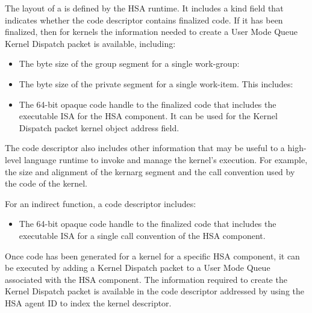 \documentclass[final,oneside]{book}
\begin{document}
The layout of a  is defined by the HSA runtime.
It includes a kind field  that indicates whether
the code descriptor contains finalized code. If it has been finalized, then for
kernels the information needed to create a User Mode Queue Kernel Dispatch
packet is available, including:
\begin{itemize}
\item{The byte size of the group segment for a single work-group:}
    
\item{The byte size of the private segment for a single work-item. This
    includes:}        
\item{The 64-bit opaque code handle to the finalized code that includes the
    executable ISA for the HSA component. It can be used for the Kernel Dispatch
    packet kernel object address field.}
\end{itemize}

The code descriptor also includes other information that may be useful to a
high-level language runtime to invoke and manage the kernel's execution. For
example, the size and alignment of the kernarg segment and the call convention
used by the code of the kernel.

For an indirect function, a code descriptor includes:
\begin{itemize}
\item{The 64-bit opaque code handle to the finalized code that includes the
    executable ISA for a single call convention of the HSA component.}
\end{itemize}

Once code has been generated for a kernel for a specific HSA component, it can
be executed by adding a Kernel Dispatch packet to a User Mode Queue associated
with the HSA component. The information required to create the Kernel Dispatch
packet is available in the code descriptor addressed by using the HSA agent ID
to index the kernel descriptor.
\end{document}
